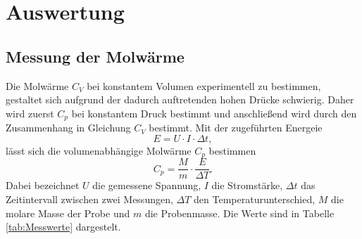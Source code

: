 \section{Auswertung}
\label{sec:Auswertung}
\subsection{Messung der Molwärme}

Die Molwärme $C_V$ bei konstantem Volumen experimentell zu bestimmen,
gestaltet sich aufgrund der dadurch auftretenden hohen Drücke schwierig.
Daher wird zuerst $C_p$ bei konstantem Druck bestimmt 
und anschließend wird durch den Zusammenhang in Gleichung  $C_V$ bestimmt.
Mit der zugeführten Energeie
\begin{equation*}
    E = U\cdot I \cdot \Delta t,
\end{equation*}
lässt sich die volumenabhängige Molwärme $C_p$ bestimmen
\begin{equation*}
    C_p = \frac{M}{m} \cdot \frac{E}{\Delta T}.
\end{equation*}
Dabei bezeichnet $U$ die gemessene Spannung,
$I$ die Stromstärke, 
$\Delta t$ das Zeitintervall zwischen zwei Messungen,
$\Delta T$ den Temperaturunterschied,
$M$ die molare Masse der Probe und
$m$ die Probenmasse.
Die  Werte sind in Tabelle \eqref{tab:Messwerte} dargestelt.


